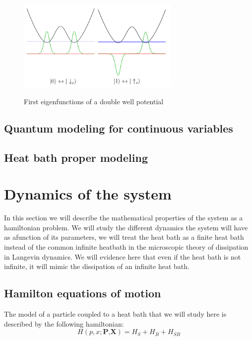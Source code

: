 \begin{figure}[H]
\centering
\includegraphics[width=0.7\textwidth]{Figures/eigen_functions.png}
\label{fig:double_well_eigen}
\caption{First eigenfunctions of a double well potential}

\end{figure}





\subsection{Quantum modeling for continuous variables}

\subsection{Heat bath proper modeling}

\section{Dynamics of the system}
In this section we will describe the mathematical properties of the system as a hamiltonian problem. We will study the different dynamics the system will have as afunction of its parameters, we will treat the heat bath as a finite heat bath instead of the common infinite heatbath in the microscopic theory of dissipation in Langevin dynamics. We will evidence here that even if the heat bath is not infinite, it will mimic the dissipation of an infinite heat bath.

\subsection{Hamilton equations of motion}
The model of a particle coupled to a heat bath that we will study here is described by the following hamiltonian:
\begin{equation}
H(p,x;\textbf{P,X})=H_{S}+H_B+H_{SB}
\end{equation}

